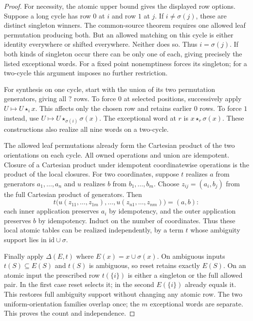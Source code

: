 \begin{proof}
For necessity, the atomic upper bound gives the displayed row options.
Suppose a long cycle has row $0$ at $i$ and row $1$ at $j$. If
$i\ne\sigma(j)$, these are distinct singleton winners. The common-source
theorem requires one allowed leaf permutation producing both. But an
allowed matching on this cycle is either identity everywhere or shifted
everywhere. Neither does so. Thus $i=\sigma(j)$. If both kinds of
singleton occur there can be only one of each, giving precisely the
listed exceptional words. For a fixed point nonemptiness forces its
singleton; for a two-cycle this argument imposes no further restriction.

For synthesis on one cycle, start with the union of its two permutation
generators, giving all $?$ rows. To force $0$ at selected positions,
successively apply $U\mapsto U\star_i x$. This affects only the chosen
row and retains earlier $0$ rows. To force $1$ instead, use
$U\mapsto U\star_{\sigma(i)}\sigma(x)$. The exceptional word at $r$ is
$x\star_r\sigma(x)$. These constructions also realize all nine words
on a two-cycle.

The allowed leaf permutations already form the Cartesian product of
the two orientations on each cycle. All owned operations and union are
idempotent. Closure of a Cartesian product under idempotent
coordinatewise operations is the product of the local closures.
For two coordinates, suppose $t$ realizes $a$ from generators
$a_1,\ldots,a_n$ and $u$ realizes $b$ from $b_1,\ldots,b_m$.
Choose $z_{ij}=(a_i,b_j)$ from the full Cartesian product of generators.
Then
\[
 t\bigl(u(z_{11},\ldots,z_{1m}),\ldots,
         u(z_{n1},\ldots,z_{nm})\bigr)=(a,b):
\]
each inner application preserves $a_i$ by idempotency, and the outer
application preserves $b$ by idempotency. Induct on the number of
coordinates. Thus these local atomic tables
can be realized independently, by a term $t$ whose ambiguity support
lies in $\mathrm{id}\cup\sigma$.

Finally apply $\Delta(E,t)$ where $E(x)=x\cup\sigma(x)$.
On ambiguous inputs $t(S)\subseteq E(S)$ and $t(S)$ is ambiguous, so
reset retains exactly $E(S)$. On an atomic input the prescribed row
$t(\{i\})$ is either a singleton or the full allowed pair. In the first
case reset selects it; in the second $E(\{i\})$ already equals it.
This restores full ambiguity support without changing any atomic row.
The two uniform-orientation families overlap once; the $m$ exceptional
words are separate. This proves the count and independence.
\end{proof}

